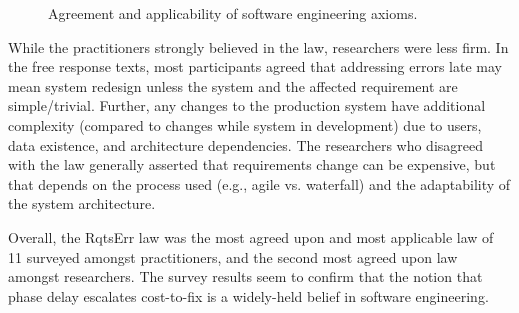 \begin{figure}[!h]
\begin{center}
\end{center}
\caption{Agreement and applicability of software engineering axioms.}
\label{fig:survey_results}
\end{figure}

While the practitioners strongly believed in the law, researchers were less firm. In the free response texts, most participants agreed that addressing errors late may mean system redesign unless the system and the affected requirement are simple/trivial. Further, any changes to the production system have additional complexity (compared to changes while system in development) due to users, data existence, and architecture dependencies. The researchers who disagreed with the law generally asserted that requirements change can be expensive, but that depends on the process used (e.g., agile vs. waterfall) and the adaptability of the system architecture.

Overall, the RqtsErr law was the most agreed upon and most applicable law of 11 surveyed amongst practitioners, and the second most agreed upon law amongst researchers. The survey results seem to confirm that the notion that phase delay escalates cost-to-fix is a widely-held belief in software engineering.